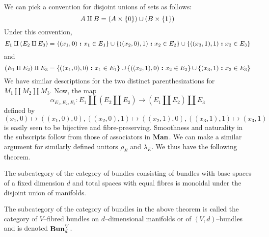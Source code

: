 \documentclass[./Thick_TQFTs_and_Quantum_Information.tex]{subfiles}
\begin{document}
We can pick a convention for disjoint unions of sets as follows:
\[
  A \amalg B = (A \times \set{0}) \cup (B \times \set{1})
\]
Under this convention,
\[
  E_1 \amalg (E_2 \amalg E_3)
    = \set[(x_1, 0)]{x_1 \in E_1}
      \cup \set[((x_2, 0), 1)]{x_2 \in E_2}
      \cup \set[((x_3, 1), 1)]{x_3 \in E_3}
\]
and
\[
  (E_1 \amalg E_2) \amalg E_3
    = \set[((x_1, 0), 0)]{x_1 \in E_1}
      \cup \set[((x_2, 1), 0)]{x_2 \in E_2}
      \cup \set[(x_3, 1)]{x_3 \in E_3}
\]
We have similar descriptions for the two distinct parenthesizations for
$M_1 \amalg M_2 \amalg M_3$. Now, the map
\[
  \alpha_{E_1, E_2, E_3} : E_1 \amalg (E_2 \amalg E_3)
                           \to (E_1 \amalg E_2) \amalg E_3
\]
defined by
\[
  (x_1, 0) \mapsto ((x_1, 0), 0),
  ((x_2, 0), 1) \mapsto ((x_2, 1), 0),
  ((x_3, 1), 1) \mapsto (x_3, 1)
\]
is easily seen to be bijective and fibre-preserving. Smoothness and naturality
in the subscripts follow from those of associators in $\textbf{Man}$. We can make a
similar argument for similarly defined unitors $\rho_E$ and $\lambda_E$. We thus
have the following theorem.
\begin{thm}
The subcategory of the category of bundles consisting of bundles with base
spaces of a fixed dimension $d$ and total spaces with equal fibres is monoidal
under the disjoint union of manifolds.
\end{thm}
\begin{defn}
The subcategory of the category of bundles in the above theorem is called the
category of $V$--fibred bundles on $d$--dimensional manifolds or of
$(V, d)$--bundles and is denoted $\textbf{Bun}^V_d$.
\end{defn}
\end{document}
